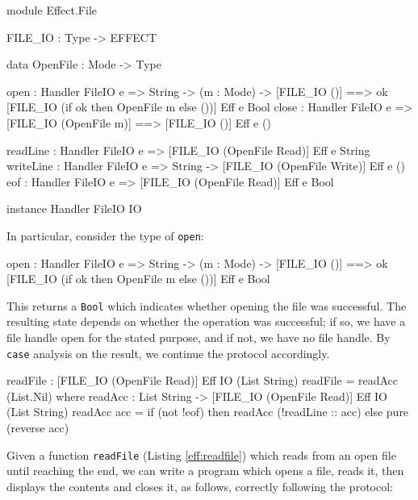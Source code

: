 \begin{code}[float=h,frame=single, caption={File I/O Effect}, label=eff:fileio]
module Effect.File

FILE_IO : Type -> EFFECT

data OpenFile : Mode -> Type

open  : Handler FileIO e => String -> (m : Mode) -> 
        { [FILE_IO ()] ==> 
          {ok} [FILE_IO (if ok then OpenFile m else ())] } Eff e Bool
close : Handler FileIO e =>
        { [FILE_IO (OpenFile m)] ==> [FILE_IO ()] } Eff e ()

readLine  : Handler FileIO e => 
           { [FILE_IO (OpenFile Read)] } Eff e String 
writeLine : Handler FileIO e => String -> 
           { [FILE_IO (OpenFile Write)] } Eff e ()
eof       : Handler FileIO e => 
           { [FILE_IO (OpenFile Read)] } Eff e Bool 

instance Handler FileIO IO
\end{code}

\noindent
In particular, consider the type of \texttt{open}:

\begin{code}
open  : Handler FileIO e => String -> (m : Mode) -> 
        { [FILE_IO ()] ==> 
          {ok} [FILE_IO (if ok then OpenFile m else ())] } Eff e Bool
\end{code}

\noindent
This returns a \texttt{Bool} which indicates whether opening the file was
successful. The resulting state depends on whether the operation was successful;
if so, we have a file handle open for the stated purpose, and if not, we have
no file handle. By \texttt{case} analysis on the result, we continue the
protocol accordingly.

\begin{code}[float=h,frame=single, caption={Reading a File}, label=eff:readfile]
readFile : { [FILE_IO (OpenFile Read)] } Eff IO (List String)
readFile = readAcc (List.Nil) where
    readAcc : List String -> { [FILE_IO (OpenFile Read)] }
              Eff IO (List String)
    readAcc acc = if (not !eof)
                     then readAcc (!readLine :: acc)
                     else pure (reverse acc)
\end{code}

Given a function \texttt{readFile} (Listing \ref{eff:readfile})
which reads from an open file until reaching the end, we can write a program
which opens a file, reads it, then displays the contents and closes it,
as follows, correctly following the protocol:

